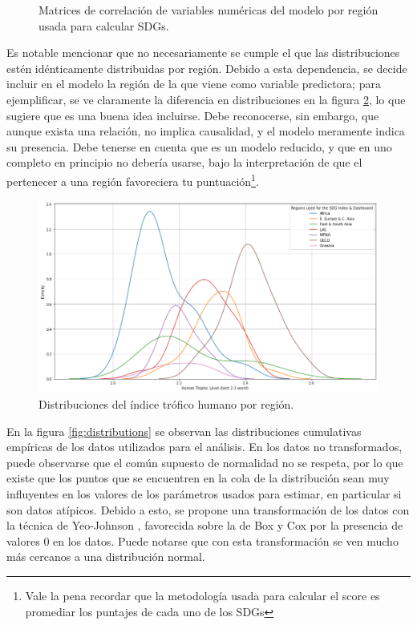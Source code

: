 \documentclass[a4paper,12pt]{amsart}
\begin{document}
\begin{figure}[!h]
\begin{subfigure}{0.49\textwidth}
        \end{subfigure}
        \caption{Matrices de correlación de variables numéricas del modelo por región usada para calcular SDGs.}\label{fig:corr_regions}
    \end{figure}

    Es notable mencionar que no necesariamente se cumple el que las distribuciones estén idénticamente 
    distribuidas por región. Debido a esta dependencia, se decide incluir en el
    modelo la región de la que viene como variable predictora; para ejemplificar, 
    se ve claramente la diferencia en distribuciones en la figura \ref{fig:HTI},
    lo que sugiere que es una buena idea incluirse. Debe reconocerse, sin embargo, 
    que aunque exista una relación, no implica causalidad, y el modelo meramente 
    indica su presencia. Debe tenerse en cuenta que es un modelo reducido, y que 
    en uno completo en principio no debería usarse, bajo la interpretación de que 
    el pertenecer a una región favoreciera tu puntuación\footnote{Vale la pena recordar que la metodología usada para calcular el score es promediar los puntajes de cada uno de los SDGs\cite{united_nations_development_programme_sustainable_nodate}}.

    \begin{figure}[h!]
        \includegraphics[width=\linewidth]{Images/Ejemplo_distribuciones.png}
        \caption{Distribuciones del índice trófico humano por región.}\label{fig:HTI}
    \end{figure}

    En la figura \ref{fig:distributions} se observan las distribuciones cumulativas 
    empíricas de los datos utilizados para el análisis. En los datos no transformados, 
    puede observarse que el común supuesto de normalidad no se respeta, por lo que 
    existe que los puntos que se encuentren en la cola de la distribución sean muy 
    influyentes en los valores de los parámetros usados para estimar, en particular 
    si son datos atípicos. Debido a esto, se propone una transformación de los datos
    con la técnica de Yeo-Johnson \cite{yeo_new_2000}, favorecida sobre la de 
    Box y Cox por la presencia de valores 0 en los datos. Puede notarse que con 
    esta transformación se ven mucho más cercanos a una distribución normal. 
\end{document}
